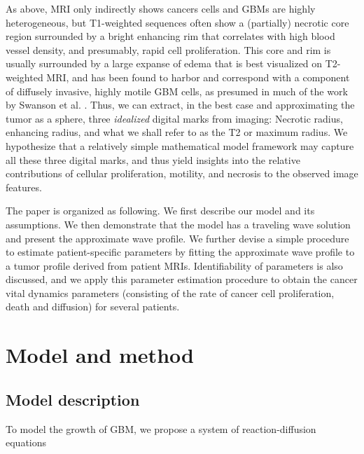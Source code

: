 \documentclass{aims}
\numberwithin{equation}{section}
\begin{document}
As above, MRI only indirectly shows cancers cells and GBMs are highly heterogeneous, but T1-weighted sequences often show a (partially) necrotic core region surrounded by a bright enhancing rim that correlates with high blood vessel density, and presumably, rapid cell proliferation. This core and
rim is usually surrounded by a large expanse of edema that is best visualized on T2-weighted MRI, and has been found to harbor and correspond with a component of diffusely invasive, highly motile
GBM cells, as presumed in much of the work by Swanson et al. \cite{Swanson2008}.  Thus, we can extract, in the best case and approximating the tumor as a sphere, three \textit{idealized} digital marks from imaging: Necrotic radius, enhancing radius, and what we shall refer to as the T2 or maximum radius. We hypothesize that a relatively simple mathematical model framework may capture all these three digital marks, and thus yield insights into the relative contributions of cellular proliferation, motility, and necrosis to the observed image features.

The paper is organized as following. We first describe our model and its assumptions.  We then demonstrate that the model has a traveling wave solution and present the approximate wave profile. We further devise a simple procedure to estimate patient-specific parameters by fitting the approximate
wave profile to a tumor profile derived from patient MRIs. Identifiability of parameters is also discussed, and we apply this parameter estimation procedure to obtain the cancer vital dynamics parameters (consisting of the rate of cancer cell proliferation, death and diffusion) for several patients.


\section{Model and method}

\subsection{Model description}
To model the growth of GBM, we propose a system of reaction-diffusion
equations
\end{document}
